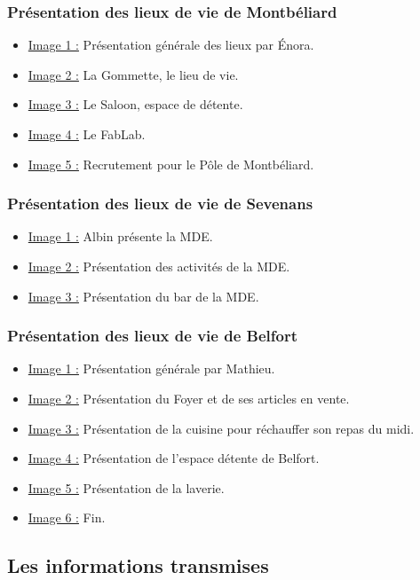 \subsubsection{Présentation des lieux de vie de Montbéliard}
\begin{itemize}
    \item \underline{Image 1 :} Présentation générale des lieux par Énora.
    \item \underline{Image 2 :} La Gommette, le lieu de vie.
    \item \underline{Image 3 :} Le Saloon, espace de détente.
    \item \underline{Image 4 :} Le FabLab.
    \item \underline{Image 5 :} Recrutement pour le Pôle de Montbéliard.
\end{itemize}

\subsubsection{Présentation des lieux de vie de Sevenans}
\begin{itemize}
    \item \underline{Image 1 :} Albin présente la MDE.
    \item \underline{Image 2 :} Présentation des activités de la MDE.
    \item \underline{Image 3 :} Présentation du bar de la MDE.
\end{itemize}

\subsubsection{Présentation des lieux de vie de Belfort}
\begin{itemize}
    \item \underline{Image 1 :} Présentation générale par Mathieu.
    \item \underline{Image 2 :} Présentation du Foyer et de ses articles en vente.
    \item \underline{Image 3 :} Présentation de la cuisine pour réchauffer son repas du midi.
    \item \underline{Image 4 :} Présentation de l'espace détente de Belfort.
    \item \underline{Image 5 :} Présentation de la laverie.
    \item \underline{Image 6 :} Fin.
\end{itemize}

\subsection{Les informations transmises}\label{subsec:les-informations-transmises}

